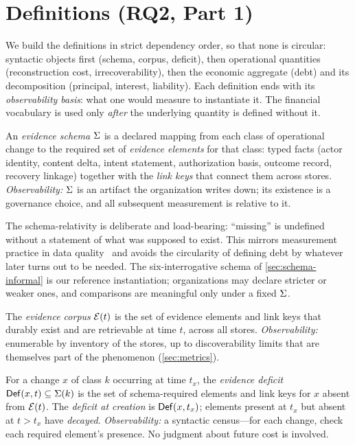\section{Definitions (RQ2, Part 1)}
\label{sec:definitions}

We build the definitions in strict dependency order, so that none is circular:
syntactic objects first (schema, corpus, deficit), then operational quantities
(reconstruction cost, irrecoverability), then the economic aggregate (debt) and its
decomposition (principal, interest, liability). Each definition ends with its
\emph{observability basis}: what one would measure to instantiate it. The financial
vocabulary is used only \emph{after} the underlying quantity is defined without it.

\begin{definition}
\label{def:schema}
An \emph{evidence schema} $\Sigma$ is a declared mapping from each class of
operational change to the required set of \emph{evidence elements} for that class:
typed facts (actor identity, content delta, intent statement, authorization basis,
outcome record, recovery linkage) together with the \emph{link keys} that connect
them across stores. \emph{Observability:} $\Sigma$ is an artifact the organization
writes down; its existence is a governance choice, and all subsequent measurement is
relative to it.
\end{definition}

The schema-relativity is deliberate and load-bearing: ``missing'' is undefined
without a statement of what was supposed to exist. This mirrors measurement practice
in data quality~\cite{wang1996} and avoids the circularity of defining debt by
whatever later turns out to be needed. The six-interrogative schema of
\cref{sec:schema-informal} is our reference instantiation; organizations may declare
stricter or weaker ones, and comparisons are meaningful only under a fixed $\Sigma$.

\begin{definition}
\label{def:corpus}
The \emph{evidence corpus} $\mathcal{E}(t)$ is the set of evidence elements and link keys
that durably exist and are retrievable at time $t$, across all stores.
\emph{Observability:} enumerable by inventory of the stores, up to discoverability
limits that are themselves part of the phenomenon (\cref{sec:metrics}).
\end{definition}

\begin{definition}
\label{def:deficit}
For a change $x$ of class $k$ occurring at time $t_x$, the \emph{evidence deficit}
$\mathsf{Def}(x, t) \subseteq \Sigma(k)$ is the set of schema-required elements and link keys
for $x$ absent from $\mathcal{E}(t)$. The \emph{deficit at creation} is $\mathsf{Def}(x, t_x)$;
elements present at $t_x$ but absent at $t > t_x$ have \emph{decayed}.
\emph{Observability:} a syntactic census---for each change, check each required
element's presence. No judgment about future cost is involved.
\end{definition}

